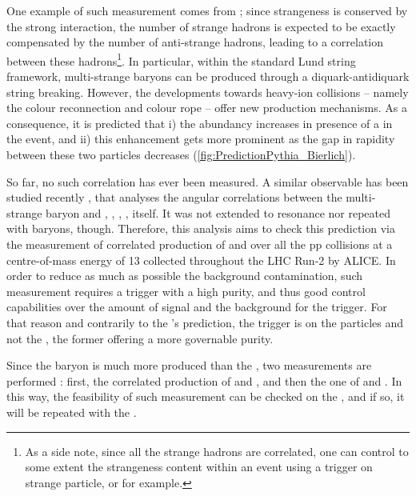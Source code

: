 One example of such measurement comes from \Pythia; since strangeness is conserved by the strong interaction, the number of strange hadrons is expected to be exactly compensated by the number of anti-strange hadrons, leading to a correlation between these hadrons\footnote{As a side note, since all the strange hadrons are correlated, one can control to some extent the strangeness content within an event using a trigger on strange particle, \rmXi or \rmOmega for example.}. In particular, within the standard Lund string framework, multi-strange baryons can be produced through a diquark-antidiquark string breaking. However, the  developments towards heavy-ion collisions -- namely the colour reconnection and colour rope \cite{christiansenStringFormationLeading2015}\cite{bierlichEffectsOverlappingStrings2015a}\cite{adolfssonQCDChallengesPp2020} -- offer new production mechanisms. As a consequence, it is predicted that i) the \rmOmega abundancy increases in presence of a \rmPhiMes in the event, and ii) this enhancement gets more prominent as the gap in rapidity between these two particles decreases (\fig\ref{fig:PredictionPythia_Bierlich}).

So far, no such correlation has ever been measured. A similar observable has been studied recently \cite{adolfssonStudyXiHadron2020}, that analyses the angular correlations between the multi-strange baryon \rmXiPM and \pOrPbar, \rmPiPM, \rmKPM, \rmLambdaPM, \rmXiPM itself. It was not extended to \rmPhiMes resonance nor repeated with \rmOmega baryons, though. Therefore, this analysis aims to check this prediction via the measurement of correlated production of \rmOmega and \rmPhiMes over all the pp collisions at a centre-of-mass energy of 13 \tev collected throughout the LHC Run-2 by ALICE. In order to reduce as much as possible the background contamination, such measurement requires a trigger with a high purity, and thus good control capabilities over the amount of signal and the background for the trigger. For that reason and contrarily to the \Pythia's prediction, the trigger is on the \rmOmega particles and not the \rmPhiMes, the former offering a more governable purity.

Since the \rmXi baryon is much more produced than the \rmOmega, two measurements are performed : first, the correlated production of \rmXi and \rmPhiMes, and then the one of \rmOmega and \rmPhiMes. In this way, the feasibility of such measurement can be checked on the \rmXi, and if so, it will be repeated with the \rmOmega.\\

